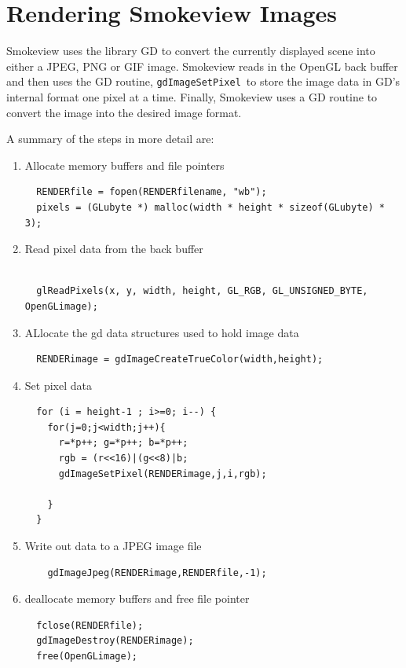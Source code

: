 \documentclass[11pt,twoside]{book}
\begin{document}
\chapter{Rendering Smokeview Images}

Smokeview uses the library GD\cite{GDLIB} to convert the currently displayed scene into either a JPEG, PNG or GIF image.  Smokeview reads in the OpenGL back buffer and then uses the GD routine, {\tt gdImageSetPixel}\ to store the image data in GD's internal format one pixel at a time.    Finally, Smokeview uses a GD routine to convert the image into the desired image format.

A summary of the steps in more detail are:
\begin{enumerate}
\item Allocate memory buffers and file pointers
\begin{verbatim}
  RENDERfile = fopen(RENDERfilename, "wb");
  pixels = (GLubyte *) malloc(width * height * sizeof(GLubyte) * 3);
\end{verbatim}

\item Read pixel data from the back buffer
\begin{verbatim}

  glReadPixels(x, y, width, height, GL_RGB, GL_UNSIGNED_BYTE, OpenGLimage);
\end{verbatim}
\item ALlocate the gd data structures used to hold image data
\begin{verbatim}
  RENDERimage = gdImageCreateTrueColor(width,height);
\end{verbatim}

\item Set pixel data

\begin{verbatim}
  for (i = height-1 ; i>=0; i--) {
    for(j=0;j<width;j++){
      r=*p++; g=*p++; b=*p++;
      rgb = (r<<16)|(g<<8)|b;
      gdImageSetPixel(RENDERimage,j,i,rgb);

    }
  }
\end{verbatim}

\item Write out data to a JPEG image file

\begin{verbatim}
    gdImageJpeg(RENDERimage,RENDERfile,-1);
\end{verbatim}

\item deallocate memory buffers and free file pointer

\begin{verbatim}
  fclose(RENDERfile);
  gdImageDestroy(RENDERimage);
  free(OpenGLimage);
\end{verbatim}

\end{enumerate}










\end{document}
